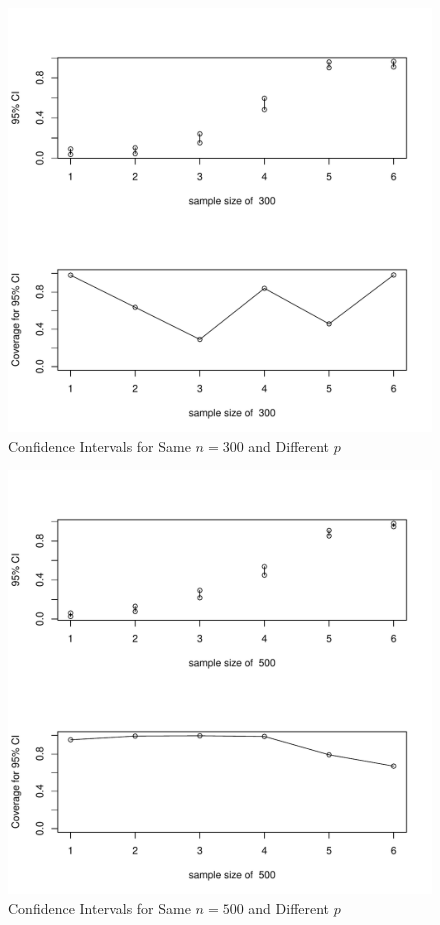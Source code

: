\documentclass[12pt,letterpaper,titlepage,en-US]{article}
\begin{document}
\begin{figure}[H]
    \caption{Confidence Intervals for Same $n = 300$ and Different $p$}
    \label{sndp}
    \centering

    \includegraphics[width=.9\textwidth]{figure/sameN300.pdf}
\end{figure}
\begin{figure}[H]
    \caption{Confidence Intervals for Same $n = 500$ and Different $p$}
    \label{sndp}
    \centering

    \includegraphics[width=.9\textwidth]{figure/sameN500.pdf}
\end{figure}
\end{document}
